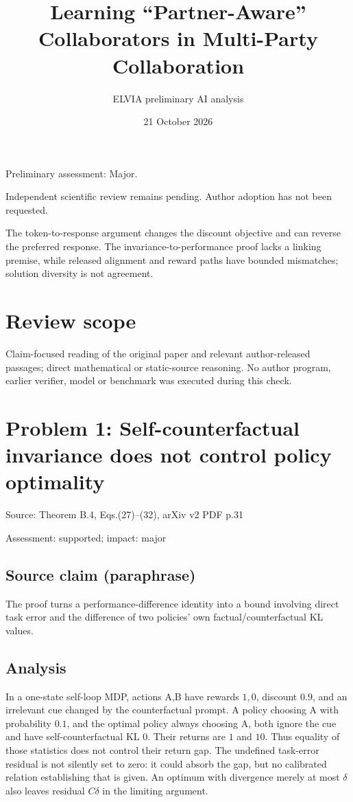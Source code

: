 \documentclass[11pt]{article}
\begin{document}
\title{Learning “Partner-Aware” Collaborators in Multi-Party Collaboration}

\author{ELVIA preliminary AI analysis}\date{21 October 2026}\maketitle

Preliminary assessment: Major.\par

Independent scientific review remains pending. Author adoption has not been requested.

The token-to-response argument changes the discount objective and can reverse the preferred response. The invariance-to-performance proof lacks a linking premise, while released alignment and reward paths have bounded mismatches; solution diversity is not agreement.

\section*{Review scope}

Claim-focused reading of the original paper and relevant author-released passages; direct mathematical or static-source reasoning. No author program, earlier verifier, model or benchmark was executed during this check.

\section*{Problem 1: Self-counterfactual invariance does not control policy optimality}

Source: Theorem B.4, Eqs.(27)–(32), arXiv v2 PDF p.31

Assessment: supported; impact: major

\subsection*{Source claim (paraphrase)}

The proof turns a performance-difference identity into a bound involving direct task error and the difference of two policies’ own factual/counterfactual KL values.

\subsection*{Analysis}

In a one-state self-loop MDP, actions A,B have rewards \(1,0\), discount \(0.9\), and an irrelevant cue changed by the counterfactual prompt. A policy choosing A with probability \(0.1\), and the optimal policy always choosing A, both ignore the cue and have self-counterfactual KL \(0\). Their returns are \(1\) and \(10\). Thus equality of those statistics does not control their return gap. The undefined task-error residual is not silently set to zero: it could absorb the gap, but no calibrated relation establishing that is given. An optimum with divergence merely at most \(\delta\) also leaves residual \(C\delta\) in the limiting argument.
\end{document}
